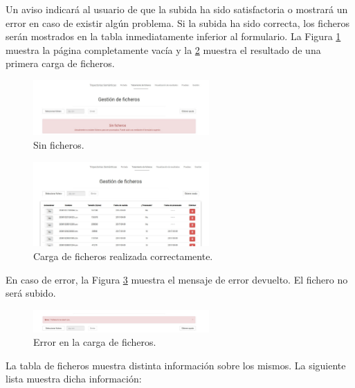 Un aviso indicará al usuario de que la subida ha sido satisfactoria o mostrará un error en caso de existir algún problema. Si la subida ha sido correcta, los ficheros serán mostrados en la tabla inmediatamente inferior al formulario. La Figura \ref{nofiles} muestra la página completamente vacía y la \ref{files} muestra el resultado de una primera carga de ficheros.

\begin{figure}[h]
  \centering
    \includegraphics[width=0.6\textwidth]{../img/manualusuario/nofiles.jpg}
  \caption{Sin ficheros.}
  \label{nofiles}
\end{figure}

\begin{figure}[h]
  \centering
    \includegraphics[width=0.6\textwidth]{../img/manualusuario/files.jpg}
  \caption{Carga de ficheros realizada correctamente.}
  \label{files}
\end{figure}

En caso de error, la Figura \ref{filerror} muestra el mensaje de error devuelto. El fichero no será subido.

\begin{figure}[h]
  \centering
    \includegraphics[width=0.6\textwidth]{../img/manualusuario/filerror.jpg}
  \caption{Error en la carga de ficheros.}
  \label{filerror}
\end{figure}

La tabla de ficheros muestra distinta información sobre los mismos. La siguiente lista muestra dicha información:

